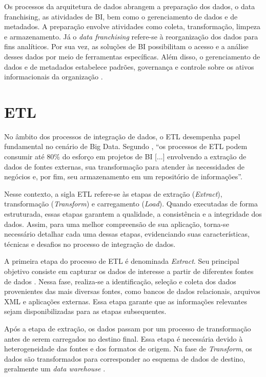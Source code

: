 Os processos da arquitetura de dados abrangem a preparação dos dados, o data 
franchising, as atividades de BI, bem como o gerenciamento 
de dados e de metadados. A preparação envolve atividades como coleta, transformação, 
limpeza e armazenamento. Já o \textit{data franchising} refere-se à reorganização dos dados para fins analíticos. 
Por sua vez, as soluções de BI possibilitam o acesso e a análise desses dados por meio de 
ferramentas específicas. Além disso, o gerenciamento de dados e de metadados estabelece 
padrões, governança e controle sobre os ativos informacionais da organização 
\cite{sherman2015business}.

\section{ETL}

No âmbito dos processos de integração de dados, o ETL desempenha papel fundamental no 
cenário de Big Data. Segundo , ``os
processos de ETL podem consumir até 80\% do esforço em projetos de BI [...] envolvendo a
extração de dados de fontes externas, sua transformação para atender às necessidades de
negócios e, por fim, seu armazenamento em um repositório de informações''.

Nesse contexto, a sigla ETL refere-se às etapas de extração (\textit{Extract}), transformação
(\textit{Transform}) e carregamento (\textit{Load}). Quando executadas de forma estruturada, essas
etapas garantem a qualidade, a consistência e a integridade dos dados. Assim, para uma melhor compreensão de
sua aplicação, torna-se necessário detalhar cada uma dessas etapas, evidenciando suas 
características, técnicas e desafios no processo de integração de dados.

A primeira etapa do processo de ETL é denominada \textit{Extract}. Seu principal objetivo consiste
em capturar os dados de interesse a partir de diferentes fontes de dados 
\cite{assisvilela2021realtime}. Nessa fase, realiza-se a identificação, seleção e 
coleta dos dados provenientes das mais diversas fontes, como bancos de dados
relacionais, arquivos XML e aplicações externas. Essa etapa garante que as informações 
relevantes sejam disponibilizadas para as etapas subsequentes.

Após a etapa de extração, os dados passam por um processo de transformação antes de 
serem carregados no destino final. Essa etapa é necessária devido à heterogeneidade 
das fontes e dos formatos de origem. Na fase de \textit{Transform}, os dados são transformados
para corresponder ao esquema de dados de destino, geralmente um \textit{data warehouse} 
\cite{venkateswarlu2023cloud}.

